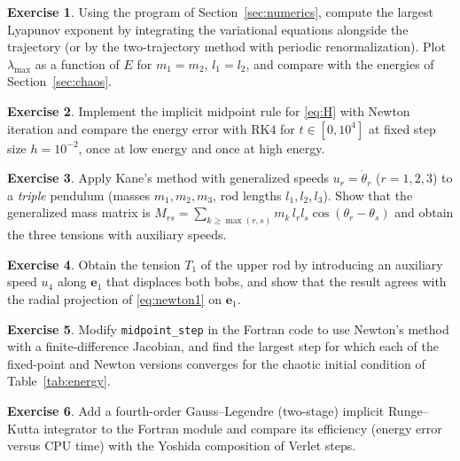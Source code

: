 \documentclass[11pt,a4paper]{book}
\theoremstyle{definition}
\newtheorem{exercise}{Exercise}[chapter]
\theoremstyle{remark}
\begin{document}
\begin{exercise}
Using the program of Section~\ref{sec:numerics}, compute the largest Lyapunov exponent by integrating the variational
equations alongside the trajectory (or by the two-trajectory method with periodic renormalization). Plot $\lambda_{\max}$
as a function of $E$ for $m_1=m_2$, $l_1=l_2$, and compare with the energies of Section~\ref{sec:chaos}.
\end{exercise}

\begin{exercise}
Implement the implicit midpoint rule for \eqref{eq:H} with Newton iteration and compare the energy error with RK4 for
$t\in[0,10^4]$ at fixed step size $h=10^{-2}$, once at low energy and once at high energy.
\end{exercise}

\begin{exercise}
Apply Kane's method with generalized speeds $u_r=\dot\theta_r$ ($r=1,2,3$) to a \emph{triple} pendulum
(masses $m_1,m_2,m_3$, rod lengths $l_1,l_2,l_3$). Show that the generalized mass matrix is
$M_{rs}=\sum_{k\ge\max(r,s)}m_k\,l_rl_s\cos(\theta_r-\theta_s)$ and obtain the three tensions with auxiliary speeds.
\end{exercise}

\begin{exercise}
Obtain the tension $T_1$ of the upper rod by introducing an auxiliary speed $u_4$ along $\bm e_1$ that displaces both
bobs, and show that the result agrees with the radial projection of \eqref{eq:newton1} on $\bm e_1$.
\end{exercise}

\begin{exercise}
Modify \texttt{midpoint\_step} in the Fortran code to use Newton's method with a finite-difference Jacobian, and
find the largest step for which each of the fixed-point and Newton versions converges for the chaotic initial
condition of Table~\ref{tab:energy}.
\end{exercise}

\begin{exercise}
Add a fourth-order Gauss--Legendre (two-stage) implicit Runge--Kutta integrator to the Fortran module and compare
its efficiency (energy error versus CPU time) with the Yoshida composition of Verlet steps.
\end{exercise}
\end{document}

